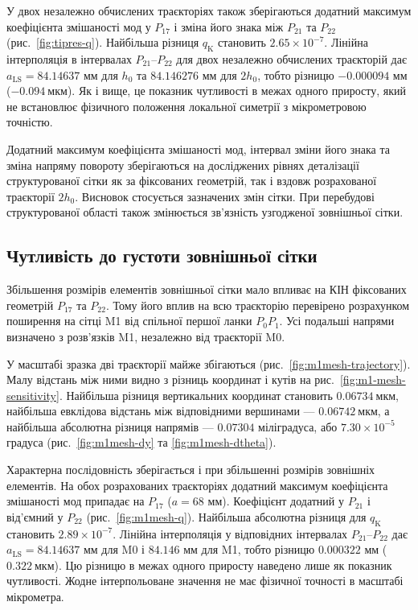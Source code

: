 \documentclass[a4paper,12pt]{article}
\begin{document}
У двох незалежно обчислених траєкторіях також зберігаються додатний максимум коефіцієнта
змішаності мод у $P_{17}$ і зміна його знака між $P_{21}$ та $P_{22}$ (рис.~\ref{fig:tipres-q}). Найбільша різниця $q_{\mathrm{K}}$ становить
$2.65\times10^{-7}$. Лінійна інтерполяція в інтервалах $P_{21}$--$P_{22}$ для двох незалежно обчислених траєкторій дає $a_{\mathrm{LS}}=84.14637$ мм
для $h_0$ та $84.146276$ мм для $2h_0$, тобто різницю $-0.000094$ мм ($-0.094~\text{мкм}$). Як і вище, це показник чутливості в межах
одного приросту, який не встановлює фізичного положення локальної симетрії з мікрометровою
точністю.

Додатний максимум коефіцієнта змішаності мод, інтервал зміни його знака та зміна напряму
повороту зберігаються на досліджених рівнях деталізації структурованої сітки як за фіксованих
геометрій, так і вздовж розрахованої траєкторії $2h_0$. Висновок стосується зазначених змін сітки.
При перебудові структурованої області також змінюється зв’язність узгодженої зовнішньої сітки.

\subsection{Чутливість до густоти зовнішньої сітки}
Збільшення розмірів елементів зовнішньої сітки мало впливає на КІН фіксованих геометрій $P_{17}$ та
$P_{22}$. Тому його вплив на всю траєкторію перевірено розрахунком поширення на сітці M1 від спільної
першої ланки $P_0P_1$. Усі подальші напрями визначено з розв’язків M1, незалежно від траєкторії M0.

У масштабі зразка дві траєкторії майже збігаються (рис.~\ref{fig:m1mesh-trajectory}). Малу відстань між ними видно з
різниць координат і кутів на рис.~\ref{fig:m1-mesh-sensitivity}. Найбільша різниця вертикальних координат становить $0.06734~\text{мкм}$,
найбільша евклідова відстань між відповідними вершинами — $0.06742~\text{мкм}$, а найбільша абсолютна різниця
напрямів — $0.07304$ міліградуса, або $7.30\times10^{-5}$ градуса (рис.~\ref{fig:m1mesh-dy} та \ref{fig:m1mesh-dtheta}).

Характерна послідовність зберігається і при збільшенні розмірів зовнішніх елементів. На обох
розрахованих траєкторіях додатний максимум коефіцієнта змішаності мод припадає на $P_{17}$ ($a=68$ мм).
Коефіцієнт додатний у $P_{21}$ і від’ємний у $P_{22}$ (рис.~\ref{fig:m1mesh-q}). Найбільша абсолютна різниця для $q_{\mathrm{K}}$
становить $2.89\times10^{-7}$. Лінійна інтерполяція у відповідних інтервалах $P_{21}$--$P_{22}$ дає $a_{\mathrm{LS}}=84.14637$ мм для M0 і $84.146$ мм
для M1, тобто різницю $0.000322$ мм ($0.322~\text{мкм}$). Цю різницю в межах одного приросту наведено лише як показник
чутливості. Жодне інтерпольоване значення не має фізичної точності в масштабі мікрометра.
\end{document}

